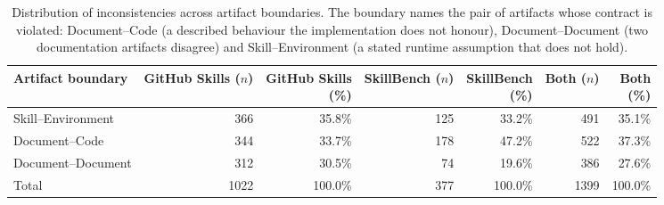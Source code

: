 \begin{table}[t]
  \centering
  \caption{Distribution of inconsistencies across artifact boundaries. The boundary names the pair of artifacts whose contract is violated: Document--Code (a described behaviour the implementation does not honour), Document--Document (two documentation artifacts disagree) and Skill--Environment (a stated runtime assumption that does not hold).}
  \label{tab:rq1-boundary}
  \small
  \setlength{\tabcolsep}{4pt}

  \begin{tabular}{lrrrrrr}
    \toprule
    Artifact boundary & \makecell{GitHub Skills\\($n$)} & \makecell{GitHub Skills\\(\%)} & \makecell{SkillBench\\($n$)} & \makecell{SkillBench\\(\%)} & \makecell{Both\\($n$)} & \makecell{Both\\(\%)} \\
    \midrule
    Skill–Environment & 366 & 35.8\% & 125 & 33.2\% & 491 & 35.1\% \\
    Document–Code & 344 & 33.7\% & 178 & 47.2\% & 522 & 37.3\% \\
    Document–Document & 312 & 30.5\% & 74 & 19.6\% & 386 & 27.6\% \\
    Total & 1022 & 100.0\% & 377 & 100.0\% & 1399 & 100.0\% \\
    \bottomrule
  \end{tabular}
\end{table}
